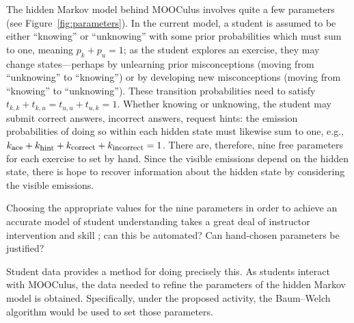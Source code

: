 \documentclass[12pt]{article}
\begin{document}
The hidden Markov model behind MOOCulus involves quite a few
parameters (see Figure~\ref{fig:parameters}).  In the current model, a
student is assumed to be either ``knowing'' or ``unknowing'' with some
prior probabilities which must sum to one, meaning $p_k + p_u = 1$; as
the student explores an exercise, they may change states---perhaps by
unlearning prior misconceptions (moving from ``unknowing'' to
``knowing'') or by developing new misconceptions (moving from
``knowing'' to ``unknowing'').  These transition probabilities need to
satisfy $t_{k,k} + t_{k,u} = t_{u,u} + t_{u,k} = 1$.  Whether knowing
or unknowing, the student may submit correct answers, incorrect
answers, request hints: the emission probabilities of doing so within
each hidden state must likewise sum to one, e.g.,
$k_{\mbox{\footnotesize ace}} + k_{\mbox{\footnotesize hint}} +
k_{\mbox{\footnotesize correct}} + k_{\mbox{\footnotesize
    incorrect}}=1$.  There are, therefore, nine free parameters for
each exercise to set by hand.  Since the visible emissions depend on
the hidden state, there is hope to recover information about the
hidden state by considering the visible emissions.

Choosing the appropriate values for the nine parameters in order to achieve an accurate model of
student understanding takes a great deal of instructor intervention
and skill \parencite{romero2010educational}; can this be automated?
Can hand-chosen parameters be justified?

Student data provides a method for doing precisely this.  As students
interact with MOOCulus, the data needed to refine the parameters of
the hidden Markov model is obtained.  Specifically, under the proposed
activity, the Baum--Welch algorithm would be used to set those
parameters.
\end{document}
